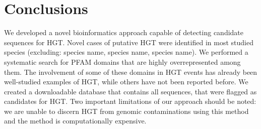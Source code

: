 \section{Conclusions}
We developed a novel bioinformatics approach capable of detecting candidate
sequences for HGT.  Novel cases of putative HGT were identified in most studied
species (excluding: species name, species name, species name). We performed a
systematic search for PFAM domains that are highly overrepresented among them.
The involvement of some of these domains in HGT events has already been
well-studied examples of HGT, while others have not been reported before. We
created a downloadable database that contains all sequences, that were flagged
as candidates for HGT.  Two important limitations of our approach should be
noted: we are unable to discern HGT from genomic contaminations using this
method and the method is computationally expensive.
